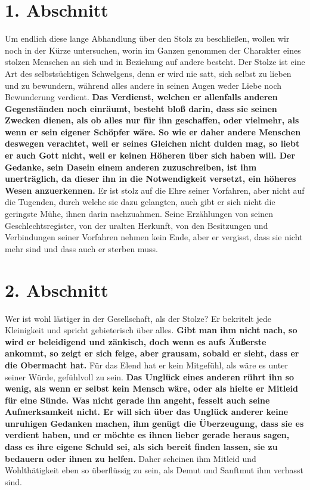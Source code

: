 \section{1. Abschnitt} \label{kap12_ab1}

 Um endlich diese lange Abhandlung über den Stolz
zu beschließen, wollen wir noch
in der Kürze untersuchen, worin im Ganzen genommen der Charakter eines stolzen
Menschen an sich und in Beziehung auf andere besteht. Der Stolze ist eine Art des
selbstsüchtigen Schwelgens, denn er wird nie satt, sich selbst zu lieben und zu
bewundern, während alles andere in seinen Augen weder Liebe noch Bewunderung
verdient.   \textbf{Das Verdienst, welchen er allenfalls anderen
Gegenständen noch
einräumt, besteht bloß darin, dass sie seinen Zwecken dienen, als ob alles nur
für ihn geschaffen, oder vielmehr, als wenn er sein eigener Schöpfer wäre. So
wie er daher andere Menschen deswegen verachtet, weil er seines Gleichen nicht
dulden mag, so liebt er auch Gott nicht, weil er keinen Höheren über sich haben
will. Der Gedanke, sein Dasein einem anderen zuzuschreiben, ist ihm unerträglich,
da dieser ihn in die Notwendigkeit versetzt, ein höheres Wesen anzuerkennen.}
Er
ist stolz auf die Ehre seiner Vorfahren, aber nicht auf die Tugenden, durch
welche sie dazu gelangten, auch gibt er sich nicht die geringste Mühe, ihnen
darin nachzuahmen. Seine Erzählungen von seinen Geschlechtsregister, von der
uralten Herkunft, von den Besitzungen und Verbindungen seiner Vorfahren nehmen
kein Ende, aber er vergisst, dass sie nicht mehr sind und dass auch er sterben
muss.

\section{2. Abschnitt} \label{kap12_ab2}

Wer ist wohl lästiger in der Gesellschaft, als der Stolze? Er bekritelt jede
Kleinigkeit und spricht gebieterisch über alles. \textbf{Gibt man ihm nicht
nach,
so wird er beleidigend und zänkisch, doch wenn es aufs Äußerste ankommt, so zeigt
er sich feige, aber grausam, sobald er sieht, dass er die
Obermacht hat.} Für das
Elend hat er kein Mitgefühl, als wäre es unter seiner
Würde, gefühlvoll zu sein.
\textbf{Das Unglück eines anderen rührt ihn so wenig, als wenn er selbst kein
Mensch
wäre, oder als hielte er Mitleid für eine Sünde. Was nicht gerade
ihn angeht,
fesselt auch seine Aufmerksamkeit nicht. Er will sich über das Unglück anderer
keine unruhigen Gedanken machen, ihm genügt die  Überzeugung, dass sie es
verdient haben, und er möchte es ihnen lieber gerade heraus sagen, dass es ihre
eigene Schuld sei, als sich bereit finden lassen, sie zu bedauern
oder ihnen zu
helfen.} Daher scheinen ihm Mitleid und Wohlthätigkeit eben so
überflüssig zu
sein, als Demut und Sanftmut ihm verhasst sind.

